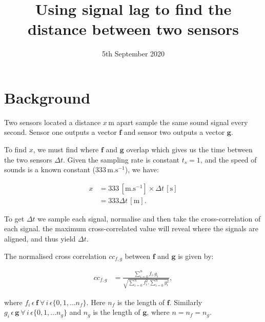 \documentclass[prb,11pt,twocolumn]{revtex4-1}
\begin{document}
\title{Using signal lag to find the distance between two sensors}
\date{5th September 2020}

\maketitle

\section{Background}
Two sensors located a distance $x\,\mathrm{m}$ apart sample the same sound signal every second. Sensor one outputs a vector $\mathbf{f}$ and sensor two outputs a vector $\mathbf{g}$.

To find $x$, we must find where $\mathbf{f}$ and $\mathbf{g}$ overlap which gives us the time between the two sensors $\Delta t$. Given the sampling rate is constant $t_s=1$, and the speed of sounds is a known constant ($333\,\mathrm{m.s^{-1}}$), we have:

\begin{align}
    x &=333\,\left[\mathrm{m.s^{-1}}\right] \times \Delta t\,\left[\mathrm{s}\right] \nonumber \\
      &=333\Delta t\,\left[\mathrm{m}\right].
\end{align}

To get $\Delta t$ we sample each signal, normalise and then take the cross-correlation  of each signal. the maximum cross-correlated value will reveal where the signals are aligned, and thus yield $\Delta t$.

The normalised cross correlation $cc_{f,g}$ between $\mathbf{f}$ and $\mathbf{g}$ is given by:

\begin{align}
    cc_{f,g} &= \frac{\sum\limits_{i=0}^{n} f_i.g_i}{\sqrt{\sum\limits_{i=0}^{n}f_i^2.\sum\limits_{i=0}^{n}g_i^2}},
\end{align}

where $f_i\,\epsilon\,\mathbf{f}\: \forall\, i\,\epsilon\{0,1,\dots n_f \}$. Here $n_f$ is the length of $\mathbf{f}$. Similarly $g_i\,\epsilon\,\mathbf{g}\: \forall\, i\,\epsilon\{0,1,\dots n_g \}$ and $n_g$ is the length of $\mathbf{g}$, where $n=n_f=n_g$.


\end{document}
